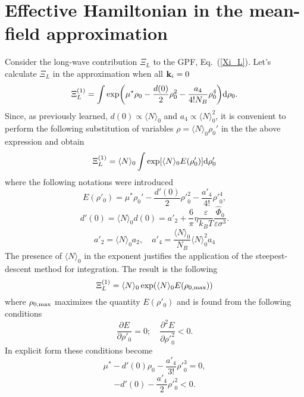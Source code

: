 \section{Effective Hamiltonian in the mean-field approximation}
Consider the long-wave contribution $\Xi_L$ to the GPF, Eq.~(\ref{Xi_L}). Let's calculate $\Xi_L$ in the approximation when all $\vb k_i=0$
\begin{equation}
	\Xi_L^{(1)} = \int \exp(\mu^*\rho_0 -\frac{d(0)}{2} \rho_0^2 - \frac{a_4}{4!N_B} \rho_0^4) {\rm d} \rho_0.
\end{equation}
Since, as previously learned, $d(0) \propto \langle N \rangle_0$ and $a_4 \propto \langle N \rangle_0^2$, it is convenient to perform the following substitution of variables $\rho = \langle N \rangle_0 \rho_0'$ in the the above expression and obtain
\begin{equation}
	\Xi_L^{(1)} = \langle N \rangle_0 \int \exp[\langle N \rangle_0 E(\rho'_0)] {\rm d} \rho'_0
\end{equation}
where the following notations were introduced
\begin{equation}
	E(\rho'_0) = \mu^*\rho_0' - \frac{d'(0)}{2} {\rho'}_0^2 - \frac{a'_4}{4!}{\rho'}_0^4,
\end{equation}
\begin{equation}
	d'(0) = \langle N \rangle_0 d(0) = a'_2 + \frac{6}{\pi}\eta \frac{\varepsilon}{k_BT} \frac{\hat{\Phi}_0}{\varepsilon\sigma^3}.
\end{equation}
\begin{equation}
	a'_2 = \langle N \rangle_0 a_2, \quad a'_4 = \frac{\langle N \rangle_0}{N_B} \langle N \rangle_0^2 a_4
\end{equation}
The presence of $\langle N \rangle_0$ in the exponent justifies the application of the steepest-descent method for integration. The result is the following
\begin{equation}
	\Xi_L^{(1)} = \langle N \rangle_0 \exp(\langle N \rangle_0 E(\rho_{0,{\rm max}}))
\end{equation}
where $\rho_{0,{\rm max}}$ maximizes the quantity $E(\rho'_0)$ and is found from the following conditions
\begin{equation}
	\frac{\partial E}{\partial \rho'_0} = 0; \quad \frac{\partial^2 E}{\partial {\rho'}_0^2} < 0.
\end{equation}
In explicit form these conditions become
\begin{equation}
	\mu^*-d'(0)\rho_0 - \frac{a'_4}{3!}{\rho'}_0^3 = 0,
\end{equation}
\begin{equation}
	-d'(0) - \frac{a'_4}{2}{\rho'}_0^2 < 0.
\end{equation}

